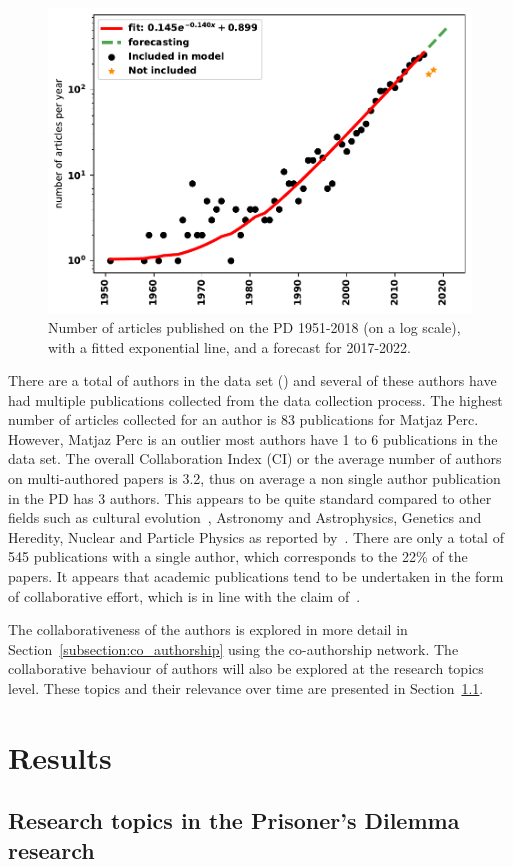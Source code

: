 \documentclass{article}
\theoremstyle{definition}
\newcommand{\authors}{}
\begin{document}
\begin{figure}[!hbtp]
    \centering
    \includegraphics[width=.50\textwidth]{./assets/images/forecasting.pdf}
    \caption{Number of articles published on the PD 1951-2018 (on a log scale),
    with a fitted exponential line, and a forecast for 2017-2022.}\label{fig:timeseries}
\end{figure}

There are a total of \authors authors in the data set (\cite{pd_data_2018}) and several of these
authors have had multiple publications collected from the data collection process.
The highest number of articles collected for an
author is 83 publications for Matjaz Perc. However, Matjaz Perc is an outlier
most authors have 1 to 6 publications in the data set.
The overall Collaboration Index (CI) or the average number of authors on
multi-authored papers is 3.2, thus on average a non single author publication in
the PD has 3 authors. This appears to be quite standard compared to other fields
such as cultural evolution~\cite{youngblood2018}, Astronomy and Astrophysics,
Genetics and Heredity, Nuclear and Particle Physics as reported
by~\cite{nature_author_blog}.
There are only a total of 545 publications with a single author, which
corresponds to the 22\% of the papers. It appears that academic publications
tend to be undertaken in the form of collaborative effort, which is in line
with the claim of~\cite{Kyvik2017}.

The collaborativeness of the authors is explored in more detail in
Section~\ref{subsection:co_authorship} using the co-authorship network. The collaborative
behaviour of authors will also be explored at the research topics level. These topics and their
relevance over time are presented in Section~\ref{subsection:research_topics}.

\section{Results}\label{section:results}

\subsection{Research topics in the Prisoner's Dilemma research}\label{subsection:research_topics}
\end{document}
